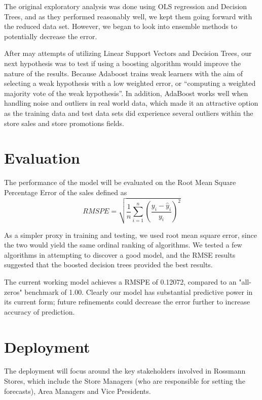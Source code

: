 \documentclass[DIV=calc, paper=a4, fontsize=11pt]{scrartcl}	 %
\begin{document}
The original exploratory analysis was done using OLS regression and Decision Trees, and as they performed reasonably well, we kept them going forward with the reduced data set. However, we began to look into ensemble methods to potentially decrease the error. 

After may attempts of utilizing Linear Support Vectors and Decision Trees, our next hypothesis was to test if using a boosting algorithm would improve the nature of the results.  Because Adaboost trains weak learners with the aim of selecting a weak hypothesis with a low weighted error, or “computing a weighted majority vote of the weak hypothesis”.\cite{Schapire} In addition, AdaBoost works well when handling noise and outliers in real world data, which made it an attractive option as the training data and test data sets did experience several outliers within the store sales and store promotions fields.


\section*{Evaluation}
The performance of the model will be evaluated on the Root Mean Square Percentage Error of the sales defined as 
\[
RMSPE = \sqrt{\frac{1}{n}\sum_{i=1}^n \left(\frac{y_i - \hat{y}_i}{y_i}\right)^2}
\]

As a simpler proxy in training and testing, we used root mean square error, since the two would yield the same ordinal ranking of algorithms. We tested a few algorithms in attempting to discover a good model, and the RMSE results suggested that the boosted decision trees provided the best results. 

The current working model achieves a RMSPE of 0.12072, compared to an "all-zeros" benchmark of 1.00. Clearly our model has substantial predictive power in its current form; future refinements could decrease the error further to increase accuracy of prediction.


\section*{Deployment}
The deployment will focus around the key stakeholders involved in Rossmann Stores, which include the Store Managers (who are responsible for setting the forecasts), Area Managers and Vice Presidents. 
\end{document}
